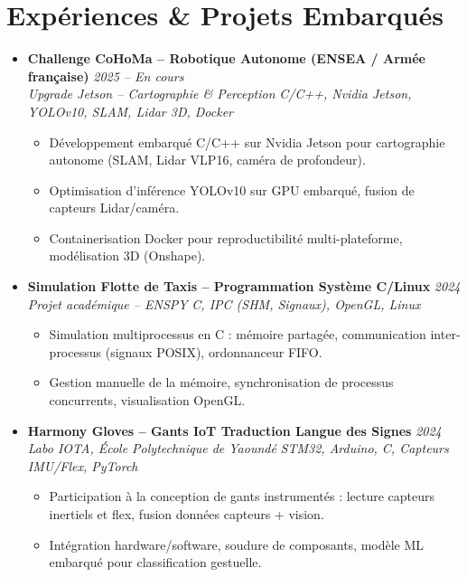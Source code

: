 \documentclass[a4paper,11pt]{article}
\begin{document}
\section{Expériences \& Projets Embarqués}
\begin{itemize}[leftmargin=*, label={-}]

\item \textbf{Challenge CoHoMa -- Robotique Autonome (ENSEA / Armée française)} \hfill \textit{2025 -- En cours} \\
\textit{Upgrade Jetson -- Cartographie \& Perception} \hfill \textit{C/C++, Nvidia Jetson, YOLOv10, SLAM, Lidar 3D, Docker}
\vspace{-2pt}
    \begin{itemize}[leftmargin=0.4cm, nosep, label=\tiny$\bullet$]
        \item \small{Développement embarqué C/C++ sur Nvidia Jetson pour cartographie autonome (SLAM, Lidar VLP16, caméra de profondeur).}
        \item \small{Optimisation d'inférence YOLOv10 sur GPU embarqué, fusion de capteurs Lidar/caméra.}
        \item \small{Containerisation Docker pour reproductibilité multi-plateforme, modélisation 3D (Onshape).}
    \end{itemize}
\vspace{3pt}

\item \textbf{Simulation Flotte de Taxis -- Programmation Système C/Linux} \hfill \textit{2024} \\
\textit{Projet académique -- ENSPY} \hfill \textit{C, IPC (SHM, Signaux), OpenGL, Linux}
\vspace{-2pt}
    \begin{itemize}[leftmargin=0.4cm, nosep, label=\tiny$\bullet$]
        \item \small{Simulation multiprocessus en C : mémoire partagée, communication inter-processus (signaux POSIX), ordonnanceur FIFO.}
        \item \small{Gestion manuelle de la mémoire, synchronisation de processus concurrents, visualisation OpenGL.}
    \end{itemize}
\vspace{3pt}

\item \textbf{Harmony Gloves -- Gants IoT Traduction Langue des Signes} \hfill \textit{2024} \\
\textit{Labo IOTA, École Polytechnique de Yaoundé} \hfill \textit{STM32, Arduino, C, Capteurs IMU/Flex, PyTorch}
\vspace{-2pt}
    \begin{itemize}[leftmargin=0.4cm, nosep, label=\tiny$\bullet$]
        \item \small{Participation à la conception de gants instrumentés : lecture capteurs inertiels et flex, fusion données capteurs + vision.}
        \item \small{Intégration hardware/software, soudure de composants, modèle ML embarqué pour classification gestuelle.}
    \end{itemize}
\vspace{3pt}


\end{itemize}
\end{document}

